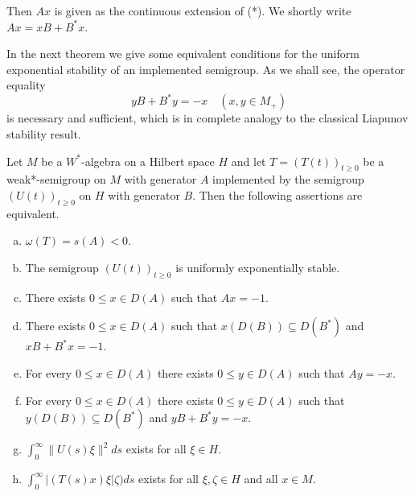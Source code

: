 \newpage


Then $Ax$ is given as the continuous extension of (*).
We shortly write $Ax = xB + B^*x$.

In the next theorem we give some equivalent conditions for the uniform exponential stability of an implemented semigroup.
As we shall see, the operator equality
\[
yB + B^*y = -x \quad (x,y \in M_{+})
\]
is necessary and sufficient, which is in complete analogy to the classical Liapunov stability result.

\begin{theorem}\label{thm:d4-2-2}
Let $M$ be a $W^*$-algebra on a Hilbert space $H$ and let $T = (T(t))_{t \geq 0}$ be a weak*-semigroup on $M$ with generator $A$ implemented by the semigroup $(U(t))_{t \geq 0}$ on $H$ with generator $B$.
Then the following assertions are equivalent.

\begin{enumerate}[(a)]
\item
$\omega(T) = s(A) < 0$.

\item
The semigroup $(U(t))_{t \geq 0}$ is uniformly exponentially stable.

\item
There exists $0 \leq x \in D(A)$ such that $Ax = -1$.

\item
There exists $0 \leq x \in D(A)$ such that $x(D(B)) \subseteq D(B^*)$ and $xB+B^*x = -1$.

\item
For every $0 \leq x \in D(A)$ there exists $0 \leq y \in D(A)$ such that $Ay = -x$.

\item
For every $0 \leq x \in D(A)$ there exists $0 \leq y \in D(A)$ such that $y(D(B)) \subseteq D(B^*)$ and $yB+B^*y = -x$.

\item
$\int_{0}^{\infty} \|U(s)\xi\|^2ds$ exists for all $\xi \in H$.

\item
$\int_{0}^{\infty} |(T(s)x)\xi|\zeta)ds$ exists for all $\xi,\zeta \in H$ and all $x \in M$.
\end{enumerate}
\end{theorem}

